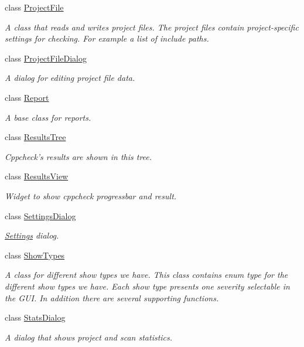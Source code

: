\begin{DoxyCompactItemize}
class \hyperlink{class_project_file}{Project\-File}
\begin{DoxyCompactList}\small\item\em A class that reads and writes project files. The project files contain project-\/specific settings for checking. For example a list of include paths. \end{DoxyCompactList}\item 
class \hyperlink{class_project_file_dialog}{Project\-File\-Dialog}
\begin{DoxyCompactList}\small\item\em A dialog for editing project file data. \end{DoxyCompactList}\item 
class \hyperlink{class_report}{Report}
\begin{DoxyCompactList}\small\item\em A base class for reports. \end{DoxyCompactList}\item 
class \hyperlink{class_results_tree}{Results\-Tree}
\begin{DoxyCompactList}\small\item\em Cppcheck's results are shown in this tree. \end{DoxyCompactList}\item 
class \hyperlink{class_results_view}{Results\-View}
\begin{DoxyCompactList}\small\item\em Widget to show cppcheck progressbar and result. \end{DoxyCompactList}\item 
class \hyperlink{class_settings_dialog}{Settings\-Dialog}
\begin{DoxyCompactList}\small\item\em \hyperlink{class_settings}{Settings} dialog. \end{DoxyCompactList}\item 
class \hyperlink{class_show_types}{Show\-Types}
\begin{DoxyCompactList}\small\item\em A class for different show types we have. This class contains enum type for the different show types we have. Each show type presents one severity selectable in the G\-U\-I. In addition there are several supporting functions. \end{DoxyCompactList}\item 
class \hyperlink{class_stats_dialog}{Stats\-Dialog}
\begin{DoxyCompactList}\small\item\em A dialog that shows project and scan statistics. \end{DoxyCompactList}\item 

\end{DoxyCompactItemize}
